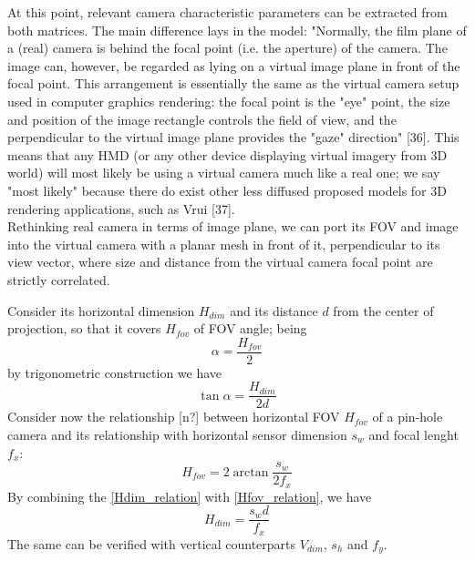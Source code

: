 At this point, relevant camera characteristic parameters can be extracted from both matrices. The main difference lays in the model: "Normally, the film plane of a (real) camera is behind the focal point (i.e. the aperture) of the camera. The image can, however, be regarded as lying on a virtual image plane in front of the focal point. This arrangement is essentially the same as the virtual camera setup used in computer graphics rendering: the focal point is the "eye" point, the size and position of the image rectangle controls the field of view, and the perpendicular to the virtual image plane provides the "gaze" direction" [36]. This means that any HMD (or any other device displaying virtual imagery from 3D world) will most likely be using a virtual camera much like a real one; we say "most likely" because there do exist other less diffused proposed models for 3D rendering applications, such as Vrui [37].\\
Rethinking real camera in terms of image plane, we can port its FOV and image into the virtual camera with a planar mesh in front of it, perpendicular to its view vector, where size and distance from the virtual camera focal point are strictly correlated.

Consider its horizontal dimension $H_{dim}$ and its distance $d$ from the center of projection, so that it covers $H_{fov}$ of FOV angle; being
\begin{equation}
\alpha = \frac {H_{fov}} {2}
\end{equation}
by trigonometric construction we have
\begin{equation}
\tan \alpha = \frac {H_{dim}} {2 d}
\label{Hdim_relation}
\end{equation}
Consider now the relationship [n?] between horizontal FOV $H_{fov}$ of a pin-hole camera and its relationship with horizontal sensor dimension $s_{w}$ and focal lenght $f_x$: 
\begin{equation}
H_{fov} = 2 \arctan \frac {s_{w}} {2 f_x}
\label{Hfov_relation}
\end{equation}
By combining the \ref{Hdim_relation} with \ref{Hfov_relation}, we have 
\begin{equation}
H_{dim} = \frac {s_{w} d} {f_x}
\label{fov_distance_relation}
\end{equation}
The same can be verified with vertical counterparts $V_{dim}$, $s_{h}$ and $f_y$.

